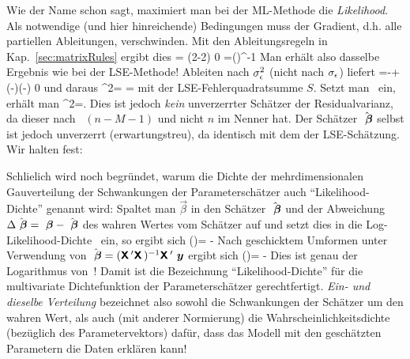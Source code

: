 \eea
Wie der Name schon sagt, maximiert man bei der ML-Methode die
\emph{Likelihood}. Als notwendige (und hier hinreichende) Bedingungen
muss der Gradient, d.h. alle partiellen Ableitungen, verschwinden. Mit
den  Ableitungsregeln in Kap.~\ref{sec:matrixRules} ergibt dies
\be
\label{hatvecbetaML}
\ablpart{\tilL}{\vec{\beta}}=
(2\tr{}-2\tr{}\vec{\beta})\stackrel{!}{=} 0
\quad \Rightarrow \quad 
\hatvecbeta=(\tr{})^{-1}\tr{}
\ee
Man erh\"alt also dasselbe Ergebnis wie bei der LSE-Methode!
Ableiten nach $\sigma_{\epsilon}^2$ (nicht nach $\sigma_{\epsilon}$) liefert
\bdm
{}=-+
 (-\vec{\beta})\tr(-\vec{\beta})
 \stackrel{!}{=} 0
\edm
und daraus
\bdm
\sigeps^2=
 = 
\edm
mit der LSE-Fehlerquadratsumme $S$.
Setzt man~ ein, erh\"alt man
\be
\hatsigeps^2=.
\ee
Dies ist jedoch \emph{kein} unverzerrter Sch\"atzer  der Residualvarianz, da dieser
nach~ $(n-M-1)$ und nicht $n$ im Nenner
hat. Der Sch\"atzer $\hat{{\mbox{ \boldmath{$\beta$}}}}$ selbst ist jedoch unverzerrt (erwartungstreu), da
identisch mit dem der LSE-Sch\"atzung.
Wir halten fest:


Schlie\3lich wird noch begr\"undet, warum die Dichte der mehrdimensionalen
Gau\3\-ver\-tei\-lung  der Schwankungen der
Parametersch\"atzer auch ``Likelihood-Dichte'' genannt wird:
Spaltet man $\vec{\beta}$ in den Sch\"atzer $\hat{{\mbox{ \boldmath{$\beta$}}}}$ und der
Abweichung $\Delta \hat{{\mbox{ \boldmath{$\beta$}}}}={\mbox{ \boldmath{$\beta$}}}-\hat{{\mbox{ \boldmath{$\beta$}}}}$ des wahren Wertes vom Sch\"atzer auf
und setzt dies in die Log-Likelihood-Dichte~
ein, so ergibt sich 
\bdm
\tilL(\Delta\hatvecbeta)=
 - 
\edm
Nach geschicktem Umformen unter Verwendung von 
$\hat{{\mbox{ \boldmath{$\beta$}}}}=(\textbf{\textsf{X}}\,'\textbf{\textsf{X}}\,)^{-1}\textbf{\textsf{X}}\,'{\mbox{ \boldmath{$y$}}}$ ergibt sich
\be
\label{tilLquadratForm}
\tilL(\Delta\hatvecbeta)=
 -  \Delta \hatvecbeta\tr{}\tr{}\Delta \hatvecbeta
\ee
Dies ist genau der Logarithmus von~!
Damit ist die Bezeichnung ``Likelihood-Dichte''
f\"ur die multivariate Dichtefunktion der Parametersch\"atzer
gerechtfertigt. \emph{Ein- und dieselbe Verteilung} bezeichnet also sowohl
die Schwankungen der Sch\"atzer um den wahren Wert, als auch (mit
anderer Normierung) die
Wahrscheinlichkeitsdichte (bez\"uglich des Parametervektors) 
daf\"ur, dass das Modell mit den
gesch\"atzten Parametern die Daten erkl\"aren kann!

